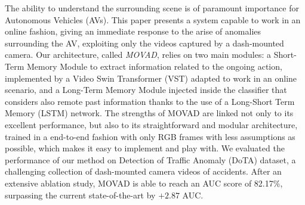 The ability to understand the surrounding scene is of paramount importance for Autonomous Vehicles (AVs).
This paper presents a system capable to work in an online fashion, giving an immediate response to the arise of anomalies surrounding the AV, exploiting only the videos captured by a dash-mounted camera.
Our architecture, called \emph{MOVAD}, relies on two main modules: a Short-Term Memory Module to extract information related to the ongoing action, implemented by a Video Swin Transformer (VST) adapted to work in an online scenario, and a Long-Term Memory Module injected inside the classifier that considers also remote past information thanks to the use of a Long-Short Term Memory (LSTM) network. 
The strengths of MOVAD are linked not only to its excellent performance, but also to its straightforward and modular architecture, trained in a end-to-end fashion with only RGB frames with less assumptions as possible, which makes it easy to implement and play with.
We evaluated the performance of our method on Detection of Traffic Anomaly (DoTA) dataset, a challenging collection of dash-mounted camera videos of accidents.
After an extensive ablation study, MOVAD is able to reach an AUC score of 82.17\%, surpassing the current state-of-the-art by $+2.87$ AUC.